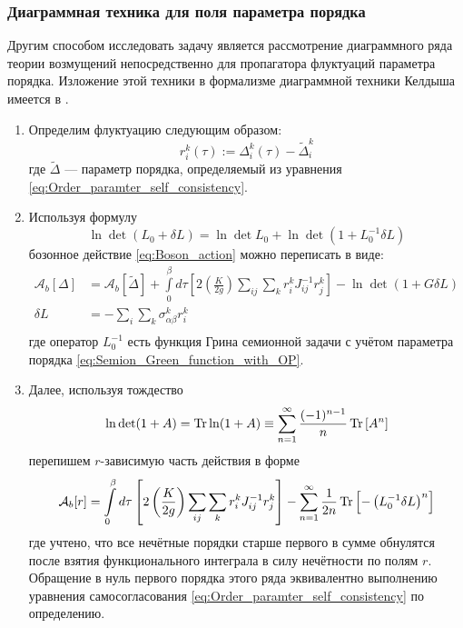 \subsubsection{Диаграммная техника для поля параметра порядка}
Другим способом исследовать задачу является рассмотрение диаграммного ряда теории возмущений непосредственно для пропагатора флуктуаций параметра порядка. Изложение этой техники в формализме диаграммной техники Келдыша имеется в \cite{Kiselev_Oppermann_2000}.
\begin{enumerate}
	\item Определим флуктуацию следующим образом:
	\begin{equation}
	\label{eq:Order_paramter_fluctuation_definition}
	r^k_i(\tau) := \Delta^k_i(\tau) - \widetilde{\Delta}^k_i
	\end{equation}
	где $\widetilde{\Delta}$ --- параметр порядка, определяемый из уравнения \eqref{eq:Order_paramter_self_consistency}.
	
	\item Используя формулу
	$$
	\ln \det \left( L_0 + \delta L \right) = \ln \det L_0 + \ln \det \left( 1 + L_0^{-1} \delta L \right)
	$$
	бозонное действие \eqref{eq:Boson_action} можно переписать в виде:
	\begin{align*}
	\mathcal{A}_{b} \left[ \Delta \right] & = \mathcal{A}_{b} \left[ \widetilde{\Delta} \right] + \int\limits_{0}^{\beta} d\tau \left[ 2 \left(\frac{K}{2g}\right) \sum_{ij} \sum_k r^k_i J^{-1}_{ij} r^k_j \right] - \ln \det \left( 1 + G \delta L \right) \\
	\delta L & = - \sum_i \sum_k \sigma^k_{\alpha\beta} r^k_i \\
	\end{align*}
	где оператор $L_0^{-1}$ есть функция Грина семионной задачи с учётом параметра порядка \eqref{eq:Semion_Green_function_with_OP}.
	
	\item Далее, используя тождество
	$$
	\ln \det (1 + A) = \operatorname{Tr} \ln (1 + A) \equiv \sum_{n = 1}^\infty \frac{(-1)^{n-1}}{n} \operatorname{Tr} \left[A^n\right]
	$$
	перепишем $r$-зависимую часть действия в форме
	\begin{equation*}
	\mathcal{A}_b[r] = \int\limits_{0}^{\beta} d\tau \left[ 2 \left(\frac{K}{2g}\right) \sum_{ij} \sum_k r^k_i J^{-1}_{ij} r^k_j \right] - \sum_{n = 1}^\infty \frac{1}{2n} \operatorname{Tr} \left[- \left(L_0^{-1} \delta L \right)^n\right]
	\end{equation*}
	где учтено, что все нечётные порядки старше первого в сумме обнулятся после взятия функционального интеграла в силу нечётности по полям $r$. Обращение в нуль первого порядка этого ряда эквивалентно выполнению уравнения самосогласования \eqref{eq:Order_paramter_self_consistency} по определению.
	

\end{enumerate}
